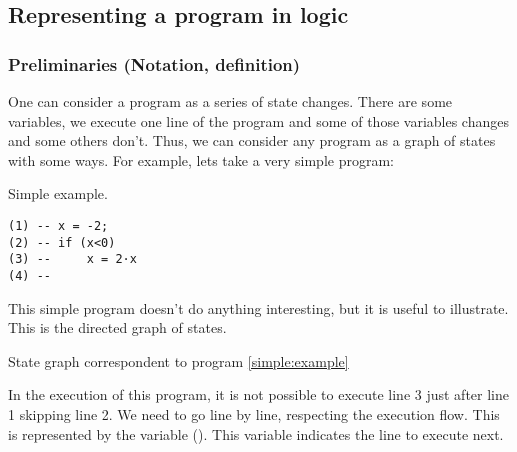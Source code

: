 \subsection{Representing a program in logic}

\subsubsection{Preliminaries (Notation, definition)}

One can consider a program as a series of state changes. There are some variables, we execute one line of the program and some of those variables changes and some others don't. Thus, we can consider any program as a graph of states with some ways. For example, lets take a very simple program:

\begin{center}
\caption{Simple example.}
\begin{lstlisting}
(1) -- x = -2;
(2) -- if (x<0) 
(3) --     x = 2·x 
(4) --
\end{lstlisting}
\label{simple:example}
\end{center}

This simple program doesn't do anything interesting, but it is useful to illustrate. This is the directed graph of states.

\begin{center}

\caption{State graph correspondent to program \ref{simple:example}}
\end{center}

In the execution of this program, it is not possible to execute line 3 just after line 1 skipping line 2. We need to go line by line, respecting the execution flow. 
This is represented by the variable \pc (). This variable indicates the line to execute next.

